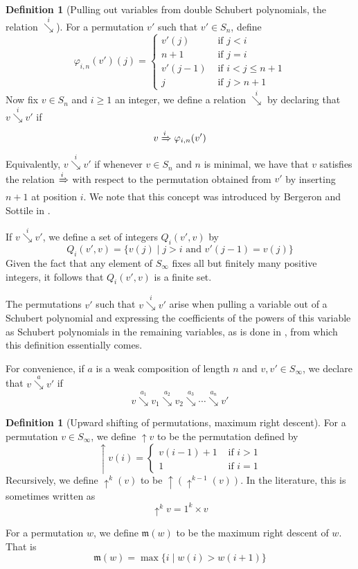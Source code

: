 \documentclass{amsart}
\theoremstyle{definition}
\newtheorem{definition}[lemma]{Definition}
\theoremstyle{remark}
\numberwithin{equation}{subsection}
\newcommand{\shup}{{\uparrow}}
\newcommand{\downvar}[1]{\stackrel{#1}{\searrow}}
\newcommand{\Tom}[1]{\xRightarrow{#1}}
\newcommand{\smpre}[2]{\ensuremath{}\prod_{b\in #2}(#1-b)}
\newcommand{\maxd}{\mathfrak{m}}
\begin{document}
\begin{definition}[Pulling out variables from double Schubert polynomials, the relation $\downvar{i}$] \label{definition:polysequence}
		For a permutation $v'$ such that $v'\in S_{n}$, define
		$$\varphi_{i,n}(v')(j)=\begin{cases}
			v'(j)&\mbox{ if }j<i\\
			n+1&\mbox{ if }j=i\\
			v'(j-1)&\mbox{ if }i<j\leq n+1\\
			j&\mbox{ if }j>n+1
		\end{cases}$$
		Now fix $v\in S_n$ and $i\geq 1$ an integer, we define a relation $\downvar{i}$ by declaring that $v\downvar{i} v'$ if 
		$$v\Tom{i}\varphi_{i,n}(v')$$
		Equivalently, $v\downvar{i} v'$ if whenever $v\in S_n$ and $n$ is minimal, we have that $v$ satisfies the relation $\Tom{i}$ with respect to the permutation obtained from $v'$ by inserting $n+1$ at position $i$. We note that this concept was introduced by Bergeron and Sottile in \cite{bsskew}.
		
		If $v\downvar{i} v'$, we define a set of integers $Q_i(v',v)$ by
		$$Q_i(v',v)=\{v(j)\mid j>i\mbox{ and }v'(j-1)=v(j)\}$$
		Given the fact that any element of $S_\infty$ fixes all but finitely many positive integers, it follows that $Q_i(v',v)$ is a finite set.
		
		The permutations $v'$ such that $v\downvar{i} v'$ arise when pulling a variable out of a Schubert polynomial and expressing the coefficients of the powers of this variable as Schubert polynomials in the remaining variables, as is done in \cite{coprod}, from which this definition essentially comes.

    For convenience, if $a$ is a weak composition of length $n$ and $v,v'\in S_\infty$, we declare that $v\downvar{a} v'$ if
    $$v\downvar{a_1} v_1\downvar{a_2} v_2\downvar{a_3}\cdots \downvar{a_n} v'$$
  \end{definition}
  
\begin{definition}[Upward shifting of permutations, maximum right descent]
		For a permutation $v\in S_\infty$, we define $\shup{v}$ to be the permutation defined by
		$$\shup{v}(i) = \begin{cases}
			v(i-1)+1&\mbox{ if }i>1\\
			1&\mbox{ if }i=1
		\end{cases}$$
		Recursively, we define $\shup^k(v)$ to be $\shup(\shup^{k-1}(v))$. In the literature, this is sometimes written as
    $$\shup^kv = 1^k\times v$$

		For a permutation $w$, we define $\maxd(w)$ to be the maximum right descent of $w$. That is
		$$\maxd(w) = \max\{i\mid w(i)>w(i+1)\}$$

	\end{definition}
\end{document}
